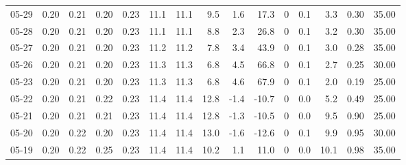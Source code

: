 \begin{threeparttable}
{\begin{tabular}{lrrrrrrrrrrrrrr}
  05-29 &          0.20 &          0.21 &          0.20 &        0.23 &                11.1 &               11.1 &                 9.5 &        1.6 &         17.3 &              0 &                 0.1 &              3.3 &            0.30 &                  35.00 \\
  05-28 &          0.20 &          0.21 &          0.20 &        0.23 &                11.1 &               11.1 &                 8.8 &        2.3 &         26.8 &              0 &                 0.1 &              3.2 &            0.30 &                  35.00 \\
  05-27 &          0.20 &          0.21 &          0.20 &        0.23 &                11.2 &               11.2 &                 7.8 &        3.4 &         43.9 &              0 &                 0.1 &              3.0 &            0.28 &                  35.00 \\
  05-26 &          0.20 &          0.21 &          0.20 &        0.23 &                11.3 &               11.3 &                 6.8 &        4.5 &         66.8 &              0 &                 0.1 &              2.7 &            0.25 &                  30.00 \\
  05-23 &          0.20 &          0.21 &          0.20 &        0.23 &                11.3 &               11.3 &                 6.8 &        4.6 &         67.9 &              0 &                 0.1 &              2.0 &            0.19 &                  25.00 \\
  05-22 &          0.20 &          0.21 &          0.22 &        0.23 &                11.4 &               11.4 &                12.8 &       -1.4 &        -10.7 &              0 &                 0.0 &              5.2 &            0.49 &                  25.00 \\
  05-21 &          0.20 &          0.21 &          0.21 &        0.23 &                11.4 &               11.4 &                12.8 &       -1.3 &        -10.5 &              0 &                 0.0 &              9.5 &            0.90 &                  25.00 \\
  05-20 &          0.20 &          0.22 &          0.20 &        0.23 &                11.4 &               11.4 &                13.0 &       -1.6 &        -12.6 &              0 &                 0.1 &              9.9 &            0.95 &                  30.00 \\
  05-19 &          0.20 &          0.22 &          0.25 &        0.23 &                11.4 &               11.4 &                10.2 &        1.1 &         11.0 &              0 &                 0.0 &             10.1 &            0.98 &                  35.00 \\

\end{tabular}}
\end{threeparttable}
